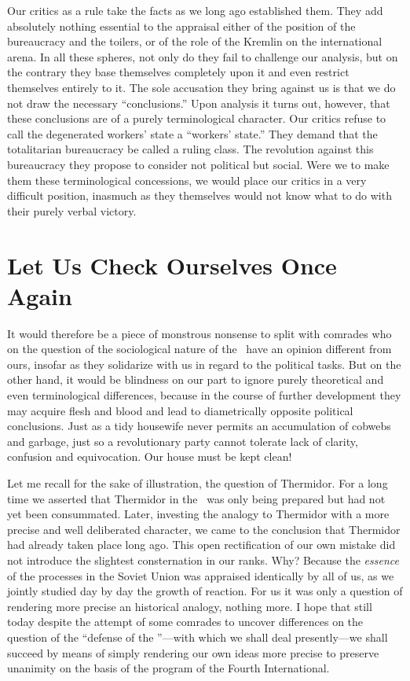 Our critics as a rule take the facts as we long ago established them. They add absolutely nothing essential to the appraisal either of the position of the bureaucracy and the toilers, or of the role of the Kremlin on the international arena. In all these spheres, not only do they fail to challenge our analysis, but on the contrary they base themselve\textsl{}s completely upon it and even restrict themselves entirely to it. The sole accusation they bring against us is that we do not draw the necessary “conclusions.” Upon analysis it turns out, however, that these conclusions are of a purely terminological character. Our critics refuse to call the degenerated workers’ state a ``workers’ state.'' They demand that the totalitarian bureaucracy be called a ruling class. The revolution against this bureaucracy they propose to consider not political but social. Were we to make them these terminological concessions, we would place our critics in a very difficult position, inasmuch as they themselves would not know what to do with their purely verbal victory.

\section*{Let Us Check Ourselves Once Again}

It would therefore be a piece of monstrous nonsense to split with comrades who on the question of the sociological nature of the \USSR\ have an opinion different from ours, insofar as they solidarize with us in regard to the political tasks. But on the other hand, it would be blindness on our part to ignore purely theoretical and even terminological differences, because in the course of further development they may acquire flesh and blood and lead to diametrically opposite political conclusions. Just as a tidy housewife never permits an accumulation of cobwebs and garbage, just so a revolutionary party cannot tolerate lack of clarity, confusion and equivocation. Our house must be kept clean!

Let me recall for the sake of illustration, the question of Thermidor. For a long time we asserted that Thermidor in the \USSR\ was only being prepared but had not yet been consummated. Later, investing the analogy to Thermidor with a more precise and well deliberated character, we came to the conclusion that Thermidor had already taken place long ago. This open rectification of our own mistake did not introduce the slightest consternation in our ranks. Why? Because the \emph{essence} of the processes in the Soviet Union was appraised identically by all of us, as we jointly studied day by day the growth of reaction. For us it was only a question of rendering more precise an historical analogy, nothing more. I hope that still today despite the attempt of some comrades to uncover differences on the question of the “defense of the \USSR”---with which we shall deal presently---we shall succeed by means of simply rendering our own ideas more precise to preserve unanimity on the basis of the program of the Fourth International.

